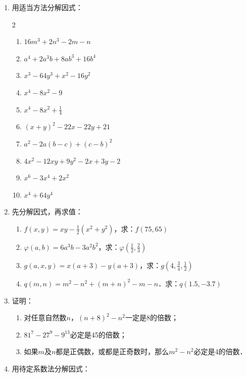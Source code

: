 \begin{enumerate}
    \item 用适当方法分解因式：
    \begin{multicols}{2}
\begin{enumerate}
    \item $16m^3+2n^3-2m-n$
    \item $a^4+2a^3b+8ab^3+16b^4$
    \item $x^3-64y^3+x^2-16y^2$
    \item $x^4-8x^2-9$
    \item $x^4-8x^2+\frac{1}{4}$
    \item $(x+y)^2-22x-22y+21$
    \item $a^2-2a(b-c)+(c-b)^2$
    \item $4x^2-12xy+9y^2-2x+3y-2$
    \item $x^6-3x^4+2x^2$
    \item $x^4+64y^4$
\end{enumerate}
\end{multicols}
    \item 先分解因式，再求值：
\begin{enumerate}
    \item $f(x,y)=xy-\frac{1}{2}(x^2+y^2)$，求：$f(75,65)$
    \item $\varphi(a,b)=6a^3b-3a^2b^2$，求：$\varphi\left(\frac{1}{2},\frac{2}{3}\right)$    
    \item $g(a,x,y)=x(a+3)-y(a+3)$，求：$g\left(4,\frac{3}{4},\frac{1}{2}\right)$
    \item $q(m,n)=m^2-n^2+(m+n)^2-m-n$．求：$q(1.5,-3.7)$
\end{enumerate}
    \item 证明：
\begin{enumerate}
    \item 对任意自然数$n$，$(n+8)^2-n^2$一定是8的倍数；
    \item $81^7-27^9-9^{13}$必定是45的倍数；
    \item 如果$m$及$n$都是正偶数，或都是正奇数时，那么$m^2-n^2$必定是4的倍数．
\end{enumerate}
    \item 用待定系数法分解因式：

\end{enumerate}
